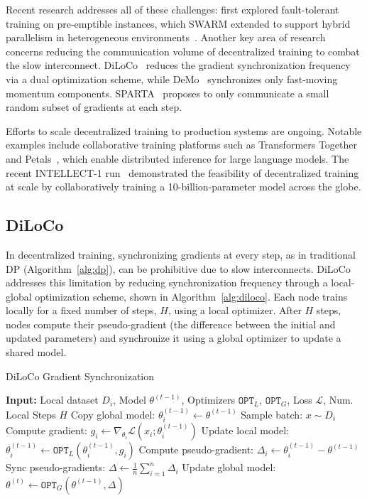\documentclass{article}
\begin{document}
Recent research addresses all of these challenges: \citeauthor{zhang2020volatileinstances} first explored fault-tolerant training on pre-emptible instances, which SWARM extended to support hybrid parallelism in heterogeneous environments~\cite{ryabinin2023swarm}. Another key area of research concerns reducing the communication volume of decentralized training to combat the slow interconnect. DiLoCo~\cite{douillard2023diloco} reduces the gradient synchronization frequency via a dual optimization scheme, while DeMo~\cite{peng2024demo} synchronizes only fast-moving momentum components. SPARTA~\cite{exo2025sparta} proposes to only communicate a small random subset of gradients at each step.

Efforts to scale decentralized training to production systems are ongoing. Notable examples include collaborative training platforms such as Transformers Together~\cite{diskin2021collaborativelearning} and Petals~\cite{borzunov2023petals}, which enable distributed inference for large language models. The recent INTELLECT-1 run~\cite{jaghouar2024intellect1} demonstrated the feasibility of decentralized training at scale by collaboratively training a 10-billion-parameter model across the globe.

\subsection{DiLoCo}

In decentralized training, synchronizing gradients at every step, as in traditional DP (Algorithm~\ref{alg:dp}), can be prohibitive due to slow interconnects. DiLoCo~\cite{douillard2023diloco} addresses this limitation by reducing synchronization frequency through a local-global optimization scheme, shown in Algorithm~\ref{alg:diloco}. Each node trains locally for a fixed number of steps, $H$, using a local optimizer. After $H$ steps, nodes compute their pseudo-gradient (the difference between the initial and updated parameters) and synchronize it using a global optimizer to update a shared model.

\begin{algorithm}
\caption{DiLoCo Gradient Synchronization}
\label{alg:diloco}
\begin{algorithmic}
\State \textbf{Input:} Local dataset $D_i$, Model $\theta^{(t-1)}$, Optimizers $\mathtt{OPT}_L$, $\mathtt{OPT}_G$, Loss $\mathcal{L}$, Num. Local Steps $H$ 
\State Copy global model: $\theta_i^{(t-1)} \gets \theta^{(t-1)}$
  \State Sample batch: $x \sim D_i$
  \State Compute gradient: $g_i \gets \nabla_{\theta_i} \mathcal{L}(x_i; \theta_i^{(t-1)})$
  \State Update local model: $\theta_i^{(t-1)} \gets \mathtt{OPT}_L(\theta_i^{(t-1)}, g_i)$
\EndFor
\State Compute pseudo-gradient: $\Delta_i \gets \theta_i^{(t-1)} - \theta^{(t-1)}$
\State Sync pseudo-gradients: $\Delta \gets \frac{1}{n} \sum_{i=1}^n \Delta_i$ 
\State Update global model: $\theta^{(t)} \gets \mathtt{OPT}_G(\theta^{(t-1)}, \Delta)$
\end{algorithmic}
\end{algorithm}
\end{document}
